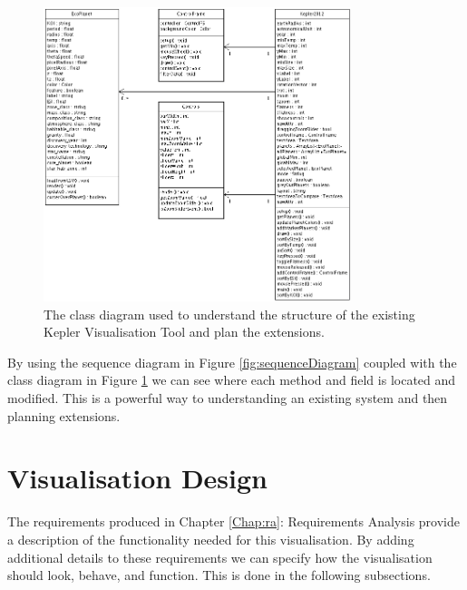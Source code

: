 \begin{enumerate}
 \begin{figure}[H]
  \centering
      \includegraphics[width=0.8\textwidth]{images/classDiagram.png}
  \caption[Class Diagram of IKVT]{The class diagram used to understand
the structure of the existing Kepler Visualisation Tool and plan the
extensions.}  
  \label{fig:classDiagram}
\end{figure}
\end{enumerate}

By using
the sequence diagram in Figure \ref{fig:sequenceDiagram} coupled with the class
diagram in Figure \ref{fig:classDiagram} we can see where each method and field
is located and modified. This is a powerful way to understanding an
existing system and then planning extensions.

\section{Visualisation Design}
The requirements produced in Chapter \ref{Chap:ra}: Requirements Analysis
provide a
description of the functionality needed for this
visualisation. By adding additional details to these requirements we can specify
how the visualisation should look, behave, and function. This is done in the
following subsections.

\clearpage
